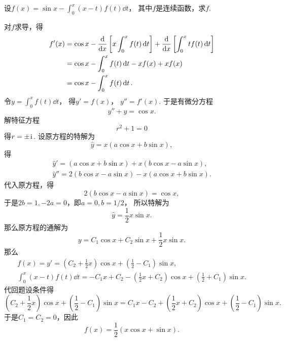 \begin{example}
设\(f(x) = \sin x - \int_0^x (x-t) f(t) \dd{t}\)，
其中\(f\)是连续函数，求\(f\).
\begin{solution}
对\(f\)求导，得\begin{align*}
	f'(x)
	&= \cos x - \dv{x}\left[ x \int_0^x f(t) \dd{t} \right]
		+ \dv{x}\left[\int_0^x t f(t) \dd{t}\right] \\
	&= \cos x - \int_0^x f(t) \dd{t} - x f(x) + x f(x) \\
	&= \cos x - \int_0^x f(t) \dd{t}.
\end{align*}
令\(y = \int_0^x f(t) \dd{t}\)，
得\(y' = f(x)\)，
\(y'' = f'(x)\).
于是有微分方程\[
	y'' + y = \cos x.
\]
解特征方程\[
	r^2 + 1 = 0
\]
得\(r = \pm\kern1pt\mathrm{i}\kern1pt\).
设原方程的特解为\[
	\hat{y} = x(a \cos x + b \sin x),
\]
得\begin{gather*}
	\hat{y}' = (a \cos x + b \sin x)
				+ x(b \cos x - a \sin x), \\
	\hat{y}'' = 2(b \cos x - a \sin x)
				- x(a \cos x + b \sin x).
\end{gather*}
代入原方程，得\[
	2(b \cos x - a \sin x)
	= \cos x,
\]
于是\(2b = 1, -2a = 0\)，即\(a=0, b=1/2\)，
所以特解为\[
	\hat{y} = \frac{1}{2} x \sin x.
\]
那么原方程的通解为\[
	y = C_1 \cos x + C_2 \sin x + \frac{1}{2} x \sin x.
\]
那么\begin{gather*}
	f(x) = y'
	= \left( C_2 + \frac{1}{2} x \right) \cos x
	+ \left( \frac{1}{2} - C_1 \right) \sin x, \\
	\int_0^x (x-t) f(t) \dd{t}
	= -C_1 x + C_2 - \left(\frac{1}{2}x+C_2\right) \cos x
	+ \left(\frac{1}{2}+C_1\right) \sin x.
\end{gather*}
代回题设条件得\[
	\left( C_2 + \frac{1}{2} x \right) \cos x
	+ \left( \frac{1}{2} - C_1 \right) \sin x
	= C_1 x - C_2 + \left(\frac{1}{2} x + C_2\right) \cos x
	+ \left(\frac{1}{2}-C_1\right) \sin x.
\]
于是\(C_1 = C_2 = 0\)，因此\[
	f(x) = \frac{1}{2} (x \cos x + \sin x).
\]
\end{solution}
\end{example}
